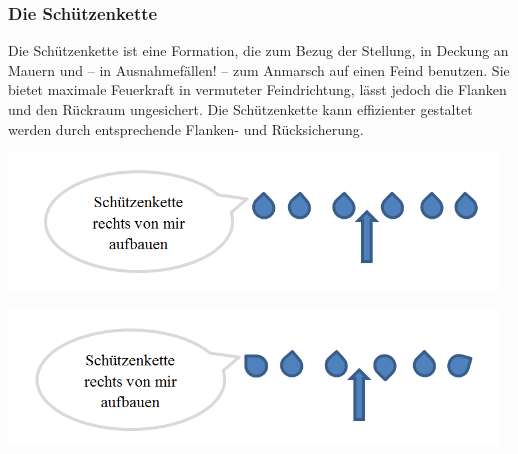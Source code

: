\subsubsection{Die Schützenkette}
Die Schützenkette ist eine Formation, die zum Bezug der Stellung, in Deckung an Mauern und -- in Ausnahmefällen! -- zum Anmarsch auf einen Feind benutzen. Sie bietet maximale Feuerkraft in vermuteter Feindrichtung, lässt jedoch die Flanken und den Rückraum ungesichert. Die Schützenkette kann effizienter gestaltet werden durch entsprechende Flanken- und Rücksicherung.\\
\begin{minipage}[t]{1\textwidth}
	\includegraphics[width=13cm]{./img/grundlagen/formationen/Schuetzenkette1.png}
\end{minipage}
\begin{minipage}[t]{1\textwidth}
	\includegraphics[width=13cm]{./img/grundlagen/formationen/Schuetzenkette2.png}
\end{minipage}